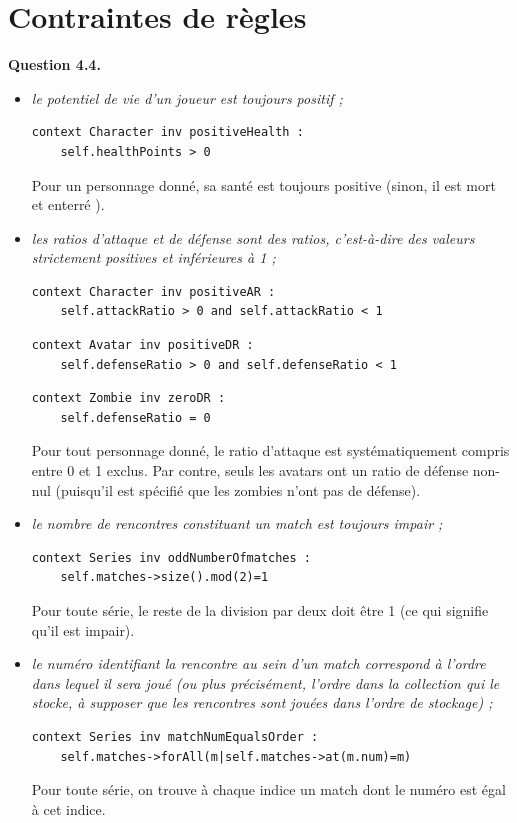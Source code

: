 \documentclass[oneside,a4paper]{book}
\begin{document}
\section{Contraintes de règles}
\textbf{Question 4.4.}\label{Question 4.4.}
\begin{itemize}
    \item \textit{le potentiel de vie d'un joueur est toujours positif ;}
        \begin{lstlisting}
context Character inv positiveHealth : 
    self.healthPoints > 0
        \end{lstlisting}
    Pour un personnage donné, sa santé est toujours positive (sinon, il est mort et enterré \textdagger).
    
    \item \textit{les ratios d'attaque et de défense sont des ratios, c'est-à-dire des valeurs strictement positives et inférieures à 1 ;}
        \begin{lstlisting}
context Character inv positiveAR : 
    self.attackRatio > 0 and self.attackRatio < 1
        \end{lstlisting}
        \begin{lstlisting}
context Avatar inv positiveDR : 
    self.defenseRatio > 0 and self.defenseRatio < 1  
        \end{lstlisting}      
        \begin{lstlisting}
context Zombie inv zeroDR : 
    self.defenseRatio = 0
        \end{lstlisting}
    
    Pour tout personnage donné, le ratio d'attaque est systématiquement compris entre 0 et 1 exclus. Par contre, seuls les avatars ont un ratio de défense non-nul (puisqu'il est spécifié que les zombies n'ont pas de défense).
    
    \item \textit{le nombre de rencontres constituant un match est toujours impair ;}
        \begin{lstlisting}
context Series inv oddNumberOfmatches : 
    self.matches->size().mod(2)=1
        \end{lstlisting}
    Pour toute série, le reste de la division par deux doit être 1 (ce qui signifie qu'il est impair).

    \item \textit{le numéro identifiant la rencontre au sein d'un match correspond à l'ordre dans lequel il sera joué (ou plus précisément, l'ordre dans la collection qui le stocke, à supposer que les rencontres sont jouées dans l'ordre de stockage) ;}
        \begin{lstlisting}
context Series inv matchNumEqualsOrder : 
    self.matches->forAll(m|self.matches->at(m.num)=m)
        \end{lstlisting}
    Pour toute série, on trouve à chaque indice un match dont le numéro est égal à cet indice.


\end{itemize}
\end{document}
